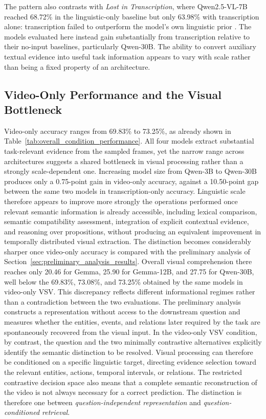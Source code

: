 The pattern also contrasts with \textit{Lost in Transcription}, where Qwen2.5-VL-7B reached 68.72\% in the linguistic-only baseline but only 63.98\% with transcription alone: transcription failed to outperform the model's own linguistic prior \cite{deodati2026lost}. The models evaluated here instead gain substantially from transcription relative to their no-input baselines, particularly Qwen-30B. The ability to convert auxiliary textual evidence into useful task information appears to vary with scale rather than being a fixed property of an architecture.
\subsection*{Video-Only Performance and the Visual Bottleneck}
\label{subsec:video_only}
Video-only accuracy ranges from 69.83\% to 73.25\%, as already shown in Table~\ref{tab:overall_condition_performance}. All four models extract substantial task-relevant evidence from the sampled frames, yet the narrow range across architectures suggests a shared bottleneck in visual processing rather than a strongly scale-dependent one. Increasing model size from Qwen-3B to Qwen-30B produces only a 0.75-point gain in video-only accuracy, against a 10.50-point gap between the same two models in transcription-only accuracy. Linguistic scale therefore appears to improve more strongly the operations performed once relevant semantic information is already accessible, including lexical comparison, semantic compatibility assessment, integration of explicit contextual evidence, and reasoning over propositions, without producing an equivalent improvement in temporally distributed visual extraction.
The distinction becomes considerably sharper once video-only accuracy is compared with the preliminary analysis of Section~\ref{sec:preliminary_analysis_results}. Overall visual comprehension there reaches only 20.46 for Gemma, 25.90 for Gemma-12B, and 27.75 for Qwen-30B, well below the 69.83\%, 73.08\%, and 73.25\% obtained by the same models in video-only VSV. This discrepancy reflects different informational regimes rather than a contradiction between the two evaluations.
The preliminary analysis constructs a representation without access to the downstream question and measures whether the entities, events, and relations later required by the task are spontaneously recovered from the visual input. In the video-only VSV condition, by contrast, the question and the two minimally contrastive alternatives explicitly identify the semantic distinction to be resolved. Visual processing can therefore be conditioned on a specific linguistic target, directing evidence selection toward the relevant entities, actions, temporal intervals, or relations. The restricted contrastive decision space also means that a complete semantic reconstruction of the video is not always necessary for a correct prediction. The distinction is therefore one between \textit{question-independent representation} and \textit{question-conditioned retrieval}.

